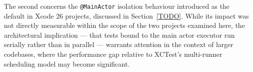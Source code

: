 The second concerns the \texttt{@MainActor} isolation behaviour introduced as the
default in Xcode 26 projects, discussed in Section~\ref{TODO}. While its impact
was not directly measurable within the scope of the two projects examined here,
the architectural implication --- that tests bound to the main actor executor run
serially rather than in parallel --- warrants attention in the context of larger
codebases, where the performance gap relative to XCTest's multi-runner scheduling
model may become significant.
